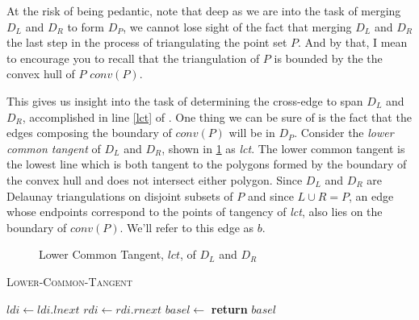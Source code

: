 \documentclass[12pt,twoside]{reedthesis}
\begin{document}
      At the risk of being pedantic, note that deep as we are into the task of merging $D_{L}$ and $D_{R}$ to form $D_{P}$, we cannot lose sight of the fact that merging $D_{L}$ and $D_{R}$ the last step in the process of triangulating the point set $P$. And by that, I mean to encourage you to recall that the triangulation of $P$ is bounded by the the convex hull of $P$ $\textit{conv}(P)$.\par

      This gives us insight into the task of determining the  cross-edge to span $D_{L}$ and $D_{R}$, accomplished in line \ref{lct} of . One thing we can be sure of is the fact that the edges composing the boundary of $\textit{conv}(P)$ will be in $D_{P}$. Consider the \emph{lower common tangent} of $D_{L}$ and $D_{R}$, shown in \cref{fig:lct} as \textit{lct}. The lower common tangent is the lowest line which is both tangent to the polygons formed by the boundary of the convex hull and does not intersect either polygon. Since $D_{L}$ and $D_{R}$ are Delaunay triangulations on disjoint subsets of $P$ and since $L \cup R = P$, an edge whose endpoints correspond to the points of tangency of \textit{lct}, also lies on the boundary of $\textit{conv}(P)$. We'll refer to this edge as $b$. \par

      \begin{figure}[!htb]
        \centering
        
        \caption{Lower Common Tangent, $lct$, of $D_{L}$ and $D_{R}$}
        \label{fig:lct}
      \end{figure}


      \begin{algorithm}[!htb]
        \caption{\textsc{Lower-Common-Tangent}}\label{del_lct}
         \begin{algorithmic}[1]
        \Loop
           \label{left_of}
            \State $ldi\gets ldi.lnext$ \label{inc_ldi}
           \label{right_of}
            \State $rdi\gets rdi.rnext$
          \Else
            \State $basel\gets$
            \State \textbf{return} $basel$ \label{lct_fin}
          \EndIf
        \EndLoop
        \EndProcedure
        \end{algorithmic} 
        \end{algorithm}
\end{document}
